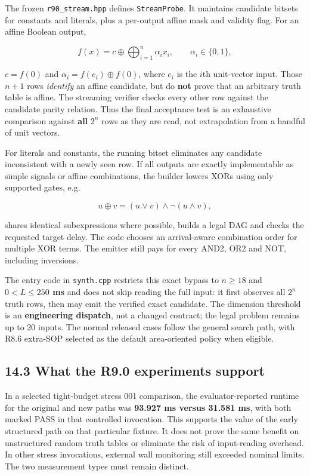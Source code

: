 The frozen \texttt{r90\_stream.hpp} defines \texttt{StreamProbe}. It maintains candidate bitsets for constants and literals, plus a per-output affine mask and validity flag. For an affine Boolean output,

\[
f(x)=c\oplus\bigoplus_{i=1}^{n}\alpha_i x_i,
\qquad \alpha_i\in\{0,1\},
\]

\(c=f(0)\) and \(\alpha_i=f(e_i)\oplus f(0)\), where \(e_i\) is the \(i\)th unit-vector input. Those \(n+1\) rows \emph{identify} an affine candidate, but do \textbf{not} prove that an arbitrary truth table is affine. The streaming verifier checks every other row against the candidate parity relation. Thus the final acceptance test is an exhaustive comparison against \textbf{all} \(2^n\) rows as they are read, not extrapolation from a handful of unit vectors.

For literals and constants, the running bitset eliminates any candidate inconsistent with a newly seen row. If all outputs are exactly implementable as simple signals or affine combinations, the builder lowers XORs using only supported gates, e.g.

\[
u\oplus v=(u\lor v)\land\neg(u\land v),
\]

shares identical subexpressions where possible, builds a legal DAG and checks the requested target delay. The code chooses an arrival-aware combination order for multiple XOR terms. The emitter still pays for every AND2, OR2 and NOT, including inversions.

The entry code in \texttt{synth.cpp} restricts this exact bypass to \textbf{\(n\ge18\)} and \textbf{\(0<L\le250\) ms} and does not skip reading the full input: it first observes all \(2^n\) truth rows, then may emit the verified exact candidate. The dimension threshold is an \textbf{engineering dispatch}, not a changed contract; the legal problem remains up to 20 inputs. The normal released cases follow the general search path, with R8.6 extra-SOP selected as the default area-oriented policy when eligible.

\subsection{14.3 What the R9.0 experiments support}\label{what-the-r9.0-experiments-support}

In a selected tight-budget stress 001 comparison, the evaluator-reported runtime for the original and new paths was \textbf{93.927 ms versus 31.581 ms}, with both marked PASS in that controlled invocation. This supports the value of the early structured path on that particular fixture. It does not prove the same benefit on unstructured random truth tables or eliminate the risk of input-reading overhead. In other stress invocations, external wall monitoring still exceeded nominal limits. The two measurement types must remain distinct.

